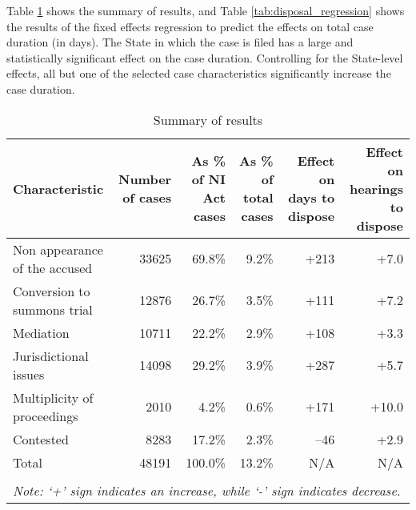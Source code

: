 Table \ref{tab:summary_results} shows the summary of results, and Table \ref{tab:disposal_regression} shows the results of the fixed effects regression to predict the effects on total case duration (in days). The State in which the case is filed has a large and statistically significant effect on the case duration. Controlling for the State-level effects, all but one of the selected case characteristics significantly increase the case duration.

{\footnotesize \begin{longtable}{@{}p{2.5cm}rrrrr}
 \caption{Summary of results}\label{tab:summary_results}\\
 \toprule
 \textbf{Characteristic} & \multicolumn{1}{p{2cm}}{\textbf{Number of cases}} &
 \multicolumn{1}{p{2cm}}{\textbf{As \% of NI Act cases}}
 & \multicolumn{1}{p{2cm}}{\textbf{As \% of total cases}}
 & \multicolumn{1}{p{2cm}}{\textbf{Effect on days to dispose}} &
 \multicolumn{1}{p{2cm}}{\textbf{Effect on hearings to dispose}}
 \\
 \midrule
 Non appearance of the accused & 33625 & 69.8\% & 9.2\% & +213 & +7.0 \\ \midrule
 Conversion to summons trial & 12876 & 26.7\% & 3.5\% & +111 & +7.2 \\ \midrule
 Mediation & 10711 & 22.2\% & 2.9\% & +108 & +3.3 \\ \midrule
 Jurisdictional issues & 14098 & 29.2\% & 3.9\% & +287 & +5.7 \\ \midrule
 Multiplicity of proceedings & 2010 & 4.2\% & 0.6\% & +171 & +10.0 \\ \midrule
 Contested & 8283 & 17.2\% & 2.3\% & --46 & +2.9 \\ \midrule
 Total & 48191 & 100.0\% & 13.2\% & N/A & N/A \\
 \bottomrule
 \\
 \multicolumn{6}{l}{{\footnotesize \emph{Note: `+' sign
 indicates an increase, while `-' sign indicates decrease.}}}\\
\end{longtable}
}

